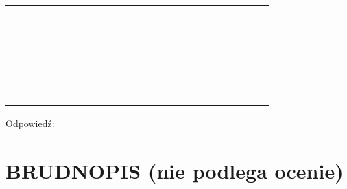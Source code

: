 \documentclass[10pt]{article}
\begin{document}
\begin{center}
\begin{tabular}{|c|c|c|c|c|c|c|c|c|c|c|c|c|c|c|c|c|c|c|c|c|c|c|c|}
\hline
 &  &  &  &  &  &  &  &  &  &  &  &  &  &  &  &  &  &  &  &  &  &  &  \\
\hline
 &  &  &  &  &  &  &  &  &  &  &  &  &  &  &  &  &  &  &  &  &  &  &  \\
\hline
 &  &  &  &  &  &  &  &  &  &  &  &  &  &  &  &  &  &  &  &  &  &  &  \\
\hline
 &  &  &  &  &  &  &  &  &  &  &  &  &  &  &  &  &  &  &  &  &  &  &  \\
\hline
 &  &  &  &  &  &  &  &  &  &  &  &  &  &  &  &  &  &  &  &  &  &  &  \\
\hline
 &  &  &  &  &  &  &  &  &  &  &  &  &  &  &  &  &  &  &  &  &  &  &  \\
\hline
 &  &  &  &  &  &  &  &  &  &  &  &  &  &  &  &  &  &  &  &  &  &  &  \\
\hline
 &  &  &  &  &  &  &  &  &  &  &  &  &  &  &  &  &  &  &  &  &  &  &  \\
\hline
 &  &  &  &  &  &  &  &  &  &  &  &  &  &  &  &  &  &  &  &  &  &  &  \\
\hline
 &  &  &  &  &  &  &  &  &  &  &  &  &  &  &  &  &  &  &  &  &  &  &  \\
\hline
 &  &  &  &  &  &  &  &  &  &  &  &  &  &  &  &  &  &  &  &  &  &  &  \\
\hline
 &  &  &  &  &  &  &  &  &  &  &  &  &  &  &  &  &  &  &  &  &  &  &  \\
\hline
 &  &  &  &  &  &  &  &  &  &  &  &  &  &  &  &  &  &  &  &  &  &  &  \\
\hline
 &  &  &  &  &  &  &  &  &  &  &  &  &  &  &  &  &  &  &  &  &  &  &  \\
\hline
 &  &  &  &  &  &  &  &  &  &  &  &  &  &  &  &  &  &  &  &  &  &  &  \\
\hline
 &  &  &  &  &  &  &  &  &  &  &  &  &  &  &  &  &  &  &  &  &  &  &  \\
\hline
 &  &  &  &  &  &  &  &  &  &  &  &  &  &  &  &  &  &  &  &  &  &  &  \\
\hline
 &  &  &  &  &  &  &  &  &  &  &  &  &  &  &  &  &  &  &  &  &  &  &  \\
\hline
 &  &  &  &  &  &  &  &  &  &  &  &  &  &  &  &  &  &  &  &  &  &  &  \\
\hline
 &  &  &  &  &  &  &  &  &  &  &  &  &  &  &  &  &  &  &  &  &  &  &  \\
\hline
 &  &  &  &  &  &  &  &  &  &  &  &  &  &  &  &  &  &  &  &  &  &  &  \\
\hline
 &  &  &  &  &  &  &  &  &  &  &  &  &  &  &  &  &  &  &  &  &  &  &  \\
\hline
 &  &  &  &  &  &  &  &  &  &  &  &  &  &  &  &  &  &  &  &  &  &  &  \\
\hline
 &  &  &  &  &  &  &  &  &  &  &  &  &  &  &  &  &  &  &  &  &  &  &  \\
\hline
 &  &  &  &  &  &  &  &  &  &  &  &  &  &  &  &  &  &  &  &  &  &  &  \\
\hline
\end{tabular}
\end{center}

Odpowiedź: \(\qquad\)

\section*{BRUDNOPIS (nie podlega ocenie)}
\end{document}
